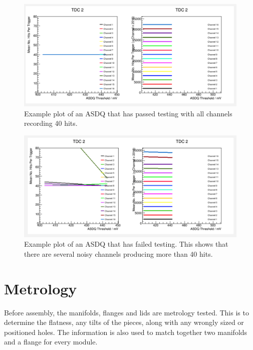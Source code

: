 \newpage
\vfill
\begin{figure}[ht]
\centering
\includegraphics[scale=0.48]{Figures/asdq_testing1}
\decoRule
\caption{Example plot of an ASDQ that has passed testing with all channels recording 40 hits.}
\label{fig:asdq_testing1}
\end{figure}

\begin{figure}[ht]
\centering
\includegraphics[scale=0.48]{Figures/asdq_testing2}
\decoRule
\caption{Example plot of an ASDQ that has failed testing. This shows that there are several noisy channels producing more than 40 hits.}
\label{fig:asdq_testing2}
\end{figure}
\vfill
\clearpage

\section{Metrology}

Before assembly, the manifolds, flanges and lids are metrology tested. This is to determine the flatness, any tilts of the pieces, along with any wrongly sized or positioned holes. The information is also used to match together two manifolds and a flange for every module. 

